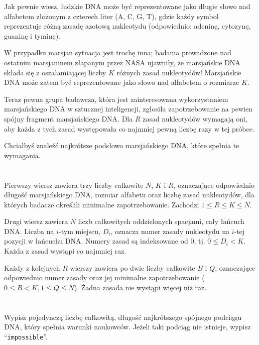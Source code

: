 \ifx\boi\undefined\fi
\def\version{jury-1}
Jak pewnie wiesz, ludzkie DNA może być reprezentowane jako długie słowo nad
alfabetem złożonym z czterech liter ({A, C, G, T}), gdzie każdy symbol reprezentuje
różną zasadę azotową nukleotydu (odpowiednio: adeninę, cytozynę, guaninę i tyminę).

W przypadku marsjan sytuacja jest trochę inna; badania prowadzone nad ostatnim
marsjaninem złapanym przez NASA ujawniły, że marsjańskie DNA składa się z oszałamiającej
liczby $K$ różnych zasad nukleotydów! Marsjańskie DNA może zatem być reprezentowane
jako słowo nad alfabetem o rozmiarze $K$.

Teraz pewna grupa badawcza, która jest zainteresowana wykorzystaniem marsjańskiego DNA
w sztucznej inteligencji, zgłosiła zapotrzebowanie na pewien spójny fragment marsjańskiego DNA.
Dla $R$ zasad nukleotydów wymagają oni, aby każda z tych zasad występowała co najmniej pewną liczbę razy w tej próbce.

Chciałbyś znaleźć najkrótsze podsłowo marsjańskiego DNA, które spełnia te wymagania.

\section*{}
Pierwszy wiersz zawiera trzy liczby całkowite $N$, $K$ i $R$, oznaczające
odpowiednio długość marsjańskiego DNA, rozmiar alfabetu oraz liczbę zasad nukleotydów,
dla których badacze określili minimalne zapotrzebowanie. Zachodzi $1 \le R \le K \le N$.

Drugi wiersz zawiera $N$ liczb całkowitych oddzielonych spacjami, cały łańcuch DNA.
Liczba na $i$-tym miejscu, $D_i$, oznacza numer zasady nukleotydu na $i$-tej pozycji w łańcuchu DNA.
Numery zasad są indeksowane od $0$, tj. $0 \leq D_i < K$. Każda z zasad wystąpi
co najmniej raz.

Każdy z kolejnych $R$ wierszy zawiera po dwie liczby całkowite $B$ i $Q$, oznaczające odpowiednio
numer zasady oraz jej minimalne zapotrzebowanie ($0 \le B < K, 1 \le Q \le N$).
Żadna zasada nie wystąpi więcej niż raz.

\section*{\outputsection}
Wypisz pojedynczą liczbę całkowitą, długość najkrótszego spójnego podciągu DNA,
który spełnia warunki naukowców. Jeżeli taki podciąg nie istnieje,
wypisz ``\texttt{impossible}''.

